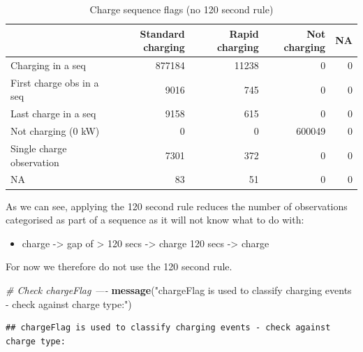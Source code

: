 \documentclass[]{article}
\newenvironment{Shaded}{\begin{snugshade}}{\end{snugshade}}
\newcommand{\CommentTok}[1]{\textcolor[rgb]{0.56,0.35,0.01}{\textit{#1}}}
\newcommand{\DataTypeTok}[1]{\textcolor[rgb]{0.13,0.29,0.53}{#1}}
\newcommand{\KeywordTok}[1]{\textcolor[rgb]{0.13,0.29,0.53}{\textbf{#1}}}
\newcommand{\NormalTok}[1]{#1}
\newcommand{\OperatorTok}[1]{\textcolor[rgb]{0.81,0.36,0.00}{\textbf{#1}}}
\newcommand{\StringTok}[1]{\textcolor[rgb]{0.31,0.60,0.02}{#1}}
\providecommand{\tightlist}{%
  \setlength{\itemsep}{0pt}\setlength{\parskip}{0pt}}
\begin{document}
\begin{table}[t]

\caption{\label{tab:checkChargeFlagMethods}Charge sequence flags (no 120 second rule)}
\centering
\begin{tabular}{l|r|r|r|r}
\hline
  & Standard charging & Rapid charging & Not charging & NA\\
\hline
Charging in a seq & 877184 & 11238 & 0 & 0\\
\hline
First charge obs in a seq & 9016 & 745 & 0 & 0\\
\hline
Last charge in a seq & 9158 & 615 & 0 & 0\\
\hline
Not charging (0 kW) & 0 & 0 & 600049 & 0\\
\hline
Single charge observation & 7301 & 372 & 0 & 0\\
\hline
NA & 83 & 51 & 0 & 0\\
\hline
\end{tabular}
\end{table}

As we can see, applying the 120 second rule reduces the number of observations categorised as part of a sequence as it will not know what to do with:

\begin{itemize}
\tightlist
\item
  charge -\textgreater{} gap of \textgreater{} 120 secs -\textgreater{} charge 120 secs -\textgreater{} charge
\end{itemize}

For now we therefore do not use the 120 second rule.

\begin{Shaded}
\begin{Highlighting}[]
\CommentTok{# Check chargeFlag ----}
\KeywordTok{message}\NormalTok{(}\StringTok{"chargeFlag is used to classify charging events - check against charge type:"}\NormalTok{)}
\end{Highlighting}
\end{Shaded}

\begin{verbatim}
## chargeFlag is used to classify charging events - check against charge type:
\end{verbatim}

\begin{Shaded}
\end{Shaded}
\end{document}
